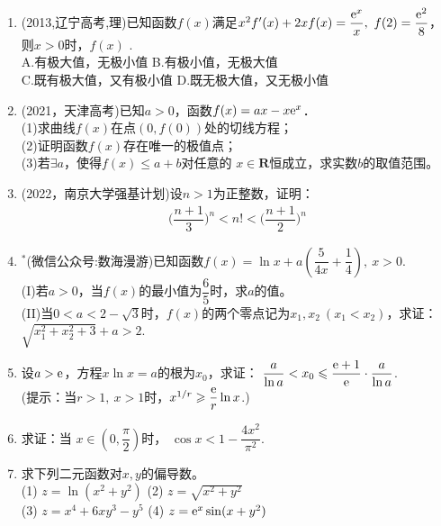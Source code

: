 \begin{enumerate}[label={\textbf{\thechapter.\arabic*}},leftmargin=
    \inteval{\myenumleftmargin}pt]
\item (2013,辽宁高考,理)已知函数$ f(x) $满足$ x^2f'(x)+2xf(x)=\dfrac{\e^x}{x},\ f(2)=\dfrac{\e^2}{8} $，则$ x>0 $时，$ f(x) $ \underline{\hspace{2cm}}. \\
A.有极大值，无极小值 \hspace{2cm}     B.有极小值，无极大值\\
C.既有极大值，又有极小值\hspace{1.4cm}  D.既无极大值，又无极小值

\item (2021，天津高考)已知$ a>0 $，函数$ f(x)=ax-x\mathrm{e}^x $．\\
(1)求曲线$ f(x) $在点$ (0,f(0)) $处的切线方程；\\
(2)证明函数$ f(x) $存在唯一的极值点；\\
(3)若$ \exists a $，使得$ f(x)\leq a+b $对任意的
$ x\in \textbf{R} $恒成立，求实数$ b $的取值范围。

\item (2022，南京大学强基计划)设$n>1$为正整数，证明：
\begin{align*}
    \Big(\dfrac{n+1}{3}\Big)^{n}<n!<\Big(\dfrac{n+1}{2}\Big)^{n}
\end{align*}

\item $ ^* $(微信公众号:数海漫游)已知函数$ f(x)=\ln x+a\left(\dfrac{5}{4x}+\dfrac{1}{4}\right),\ x>0 $.\\
(I)若$ a>0 $，当$ f(x) $的最小值为$ \dfrac{6}{5} $时，求$ a $的值。\\
(II)当$ 0<a<2-\sqrt{3} $时，$ f(x) $的两个零点记为$ x_1,x_2\ (x_1<x_2) $，求证：$ \sqrt{x_1^2+x_2^2+3}+a>2 $.

\item 设$ a>\mathrm{e} $，方程$ x\ln x=a $的根为$ x_0 $，求证：
$ \dfrac{a}{\ln a}<x_0\leqslant \dfrac{\mathrm{e}+1}{\mathrm{e}}\cdot \dfrac{a}{\ln a} $. \\
(提示：当$ r>1,\ x>1 $时，$ x^{1/r}\geqslant \dfrac{\mathrm{e}}{r}\ln x $.)

\item 求证：当 $ x\in \left(0,\dfrac{\pi}{2}\right) $时，
$ \cos x<1-\dfrac{4x^2}{\pi^2} $.

\item 求下列二元函数对$ x,y $的偏导数。\\
(1) $ z=\ln(x^2+y^2) $ \quad (2) $ z=\sqrt{x^2+y^2} $ \\
(3) $ z=x^4+6xy^3-y^5 $ \quad (4) $ z=\mathrm{e}^x\sin(x+y^2)  $ 


\end{enumerate}
